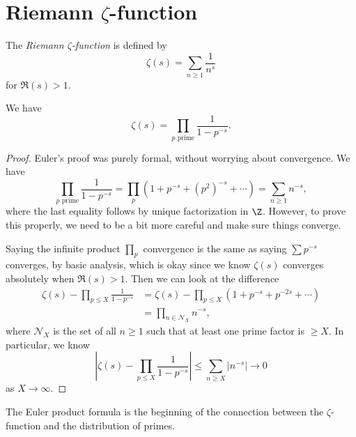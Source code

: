 \documentclass[a4paper]{article}
\begin{document}
\section{Riemann \texorpdfstring{$\zeta$}{zeta}-function}
\begin{defi}
  The \emph{Riemann $\zeta$-function} is defined by
  \[
    \zeta(s) = \sum_{n \geq 1} \frac{1}{n^s}
  \]
  for $\Re(s) > 1$.
\end{defi}

\begin{prop}
  We have
  \[
    \zeta(s) = \prod_{p \text{ prime}} \frac{1}{1 - p^{-s}}.
  \]
\end{prop}

\begin{proof}
  Euler's proof was purely formal, without worrying about convergence. We have
  \[
    \prod_{p\text{ prime}} \frac{1}{1 - p^{-s}} = \prod_p (1 + p^{-s} + (p^2)^{-s} + \cdots) = \sum_{n \geq 1} n^{-s},
  \]
  where the last equality follows by unique factorization in $\Z$. However, to prove this properly, we need to be a bit more careful and make sure things converge.

  Saying the infinite product $\prod_p$ convergence is the same as saying $\sum p^{-s}$ converges, by basic analysis, which is okay since we know $\zeta(s)$ converges absolutely when $\Re(s) > 1$. Then we can look at the difference
  \begin{align*}
    \zeta(s) - \prod_{p \leq X} \frac{1}{1 - p^{-s}} &= \zeta(s) - \prod_{p \leq X} (1 + p^{-s} + p^{-2s} + \cdots)\\
    &= \prod_{n \in \mathcal{N}_X} n^{-s},
  \end{align*}
  where $\mathcal{N}_X$ is the set of all $n \geq 1$ such that at least one prime factor is $\geq X$. In particular, we know
  \[
    \left|\zeta(s) - \prod_{p \leq X} \frac{1}{1 - p^{-s}}\right| \leq \sum_{n \geq X} |n^{-s}| \to 0
  \]
  as $X \to \infty$.
\end{proof}
The Euler product formula is the beginning of the connection between the $\zeta$-function and the distribution of primes.
\printindex
\end{document}
